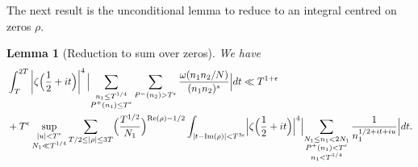 \documentclass[12pt]{amsart}
\theoremstyle{plain}
\newtheorem{lemma}[theorem]{Lemma}
\theoremstyle{definition}
\theoremstyle{remark}
\begin{document}
The next result is the unconditional lemma to reduce to an integral centred on zeros $\rho$.
%
%
%
%
\begin{lemma}[Reduction to sum over zeros]
We have
\begin{align*}
&\int_T^{2T} \left|\zeta \Bigl(\frac{1}{2}+it \Bigr) \right|^{4}\Bigl|\sum_{\substack{ n_1\le T^{1/4}\\ P^+(n_1)\le T^\epsilon}}\sum_{P^-(n_2)>T^\epsilon}\frac{\omega(n_1n_2/N)}{(n_1n_2)^s}\Bigr| dt \ll  T^{1+\epsilon} \\
&+T^{\epsilon}\sup_{\substack{|u|<T^{\epsilon}\\ N_1\ll T^{1/4}}}\sum_{T/2\le |\rho|\le 3T}\Bigl(\frac{T^{1/2}}{N_1}\Bigr)^{\textup{Re}(\rho)-1/2}\int_{|t-\textup{Im}(\rho)|<T^{3\epsilon}}\Bigl|\zeta\Bigl(\frac{1}{2}+it\Bigr)\Bigr|^4 \Bigl|\sum_{\substack{N_1\le n_1<2N_1\\ P^+(n_1)<T^\epsilon\\ n_1<T^{1/4}}}\frac{1}{n_1^{1/2+it+iu}}\Bigr| dt.
\end{align*}
\end{lemma}
%
%
%
%
\end{document}
